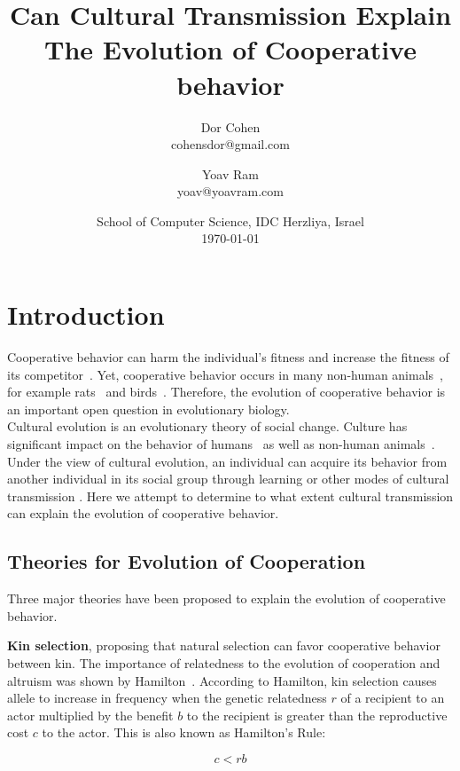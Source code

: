 \documentclass{article}
\title{Can Cultural Transmission Explain The Evolution of Cooperative behavior}
\author{Dor Cohen \\ cohensdor@gmail.com \and Yoav Ram \\ yoav@yoavram.com}
\date{School of Computer Science, IDC Herzliya, Israel\\ \today}
\begin{document}
\maketitle

\section*{Introduction}
Cooperative behavior can harm the individual's fitness and increase the fitness of its competitor~\cite{axelrod1981evolution}.
Yet, cooperative behavior occurs in many non-human animals~\cite{dugatkin1997cooperation}, for example rats~\cite{rice1962altruism} and birds~\cite{krams2008experimental}.
Therefore, the evolution of cooperative behavior is an important open question in evolutionary biology.
\\
Cultural evolution is an evolutionary theory of social change.
Culture has significant impact on the behavior of humans~\cite{ihara2004cultural,jeong2018bronze} as well as non-human animals~\cite{bonner2018evolution}.
Under the view of cultural evolution, an individual can acquire its behavior from another individual in its social group through learning or other modes of cultural transmission \cite{richerson2008not}.
Here we attempt to determine to what extent cultural transmission can explain the evolution of cooperative behavior.

\subsection*{Theories for Evolution of Cooperation}
Three major theories have been proposed to explain the evolution of cooperative behavior.

\textbf{Kin selection}, proposing that natural selection can favor cooperative behavior between kin. The importance of relatedness to the evolution of cooperation and altruism was shown by Hamilton~\cite{hamilton1964genetical}. According to Hamilton, kin selection causes allele to increase in frequency when the genetic relatedness $r$ of a recipient to an actor multiplied by the benefit $b$ to the recipient is greater than the reproductive cost $c$ to the actor. This is also known as Hamilton's Rule:

\begin{equation} \label{eq:hamilton_rule}
c<rb
\end{equation}
\end{document}

